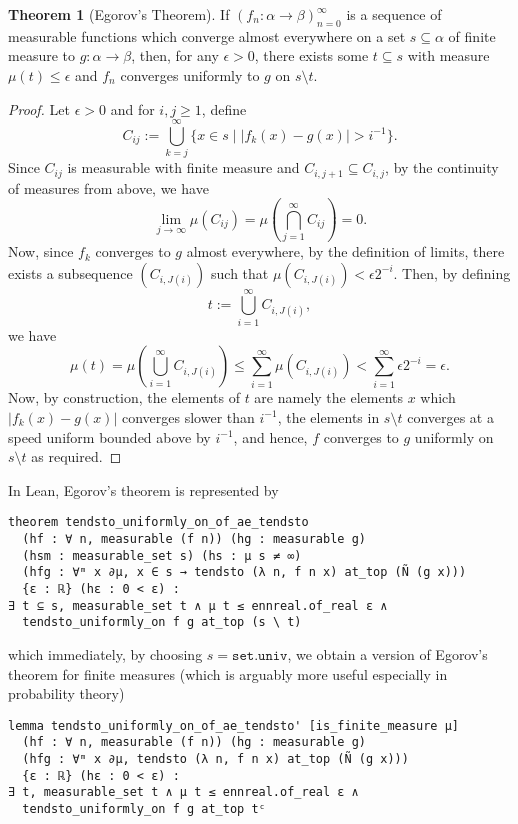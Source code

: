 \documentclass[]{article}
\theoremstyle{definition}
\newtheorem{theorem}{Theorem}
\begin{document}
\begin{theorem}[Egorov's Theorem]
  If \((f_n : \alpha \to \beta)_{n = 0}^\infty\) is a sequence of measurable functions which 
  converge almost everywhere on a set \(s \subseteq \alpha\) of finite measure to 
  \(g : \alpha \to \beta\), then, for any \(\epsilon > 0\), there exists some \(t \subseteq s\) 
  with measure \(\mu(t) \le \epsilon\) and \(f_n\) converges uniformly to \(g\) on 
  \(s \setminus t\). 
\end{theorem}
\begin{proof}
  Let \(\epsilon > 0\) and for \(i, j \ge 1\), define 
  \[C_{ij} := \bigcup_{k = j}^\infty \{x \in s \mid |f_k(x) - g(x)| > i^{-1}\}.\]
  Since \(C_{ij}\) is measurable with finite measure and \(C_{i, j + 1} \subseteq C_{i, j}\), by the 
  continuity of measures from above, we have 
  \[\lim_{j \to \infty} \mu(C_{ij}) = 
    \mu\left(\bigcap_{j = 1}^\infty C_{ij}\right) = 0.\]
  Now, since \(f_k\) converges to \(g\) almost everywhere, by the definition of 
  limits, there exists a subsequence \((C_{i, J(i)})\) such that \(\mu(C_{i, J(i)}) < 
  \epsilon 2^{-i}\). Then, by defining 
  \[t := \bigcup_{i = 1}^\infty C_{i, J(i)},\]
  we have 
  \[\mu(t) = \mu\left(\bigcup_{i = 1}^\infty C_{i, J(i)}\right) \le 
    \sum_{i = 1}^\infty \mu(C_{i, J(i)})
    < \sum_{i = 1}^\infty \epsilon 2^{-i} = \epsilon.\]
  Now, by construction, the elements of \(t\) are namely the elements \(x\) 
  which \(|f_k(x) - g(x)|\) converges slower than \(i^{-1}\), the elements in 
  \(s \setminus t\) converges at a speed uniform bounded above by \(i^{-1}\), and 
  hence, \(f\) converges to \(g\) uniformly on \(s \setminus t\) as required.
\end{proof}

In Lean, Egorov's theorem is represented by 
\begin{verbatim}
theorem tendsto_uniformly_on_of_ae_tendsto
  (hf : ∀ n, measurable (f n)) (hg : measurable g) 
  (hsm : measurable_set s) (hs : μ s ≠ ∞)
  (hfg : ∀ᵐ x ∂μ, x ∈ s → tendsto (λ n, f n x) at_top (Ñ (g x))) 
  {ε : ℝ} (hε : 0 < ε) :
∃ t ⊆ s, measurable_set t ∧ μ t ≤ ennreal.of_real ε ∧ 
  tendsto_uniformly_on f g at_top (s \ t)
\end{verbatim}
which immediately, by choosing \(s = \mathtt{set.univ}\), we obtain a version of Egorov's 
theorem for finite measures (which is arguably more useful especially in probability theory)
\begin{verbatim}
lemma tendsto_uniformly_on_of_ae_tendsto' [is_finite_measure μ]
  (hf : ∀ n, measurable (f n)) (hg : measurable g)
  (hfg : ∀ᵐ x ∂μ, tendsto (λ n, f n x) at_top (Ñ (g x)))
  {ε : ℝ} (hε : 0 < ε) :
∃ t, measurable_set t ∧ μ t ≤ ennreal.of_real ε ∧
  tendsto_uniformly_on f g at_top tᶜ
\end{verbatim}
\end{document}
